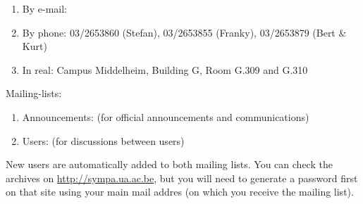 \begin{enumerate}
\item  By e-mail:  \hpcinfo
\item  By phone: 03/2653860 (Stefan), 03/2653855 (Franky), 03/2653879 (Bert \& Kurt)
\item  In real: Campus Middelheim, Building G, Room G.309 and G.310
\end{enumerate}

Mailing-lists:

\begin{enumerate}
\item  Announcements: \hpcannounceml (for official announcements and communications)
\item  Users: \hpcusersml (for discussions between users)
\end{enumerate}

New users are automatically added to both mailing lists.
You can check the archives on \url{http://sympa.ua.ac.be}, but you will need to
generate a password first on that site using your main mail addres (on which you
receive the mailing list).
